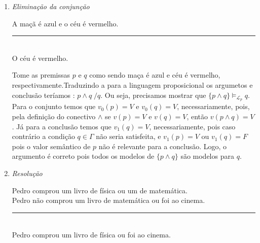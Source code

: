 \begin{enumerate}[label=\arabic*., left=0.5cm, align=left, nosep]
\begin{enumerate}[label=(\alph*), left=0.5cm, align=left, nosep]
                    \item \textit{Eliminação da conjunção}  
                        
                        A maçã é azul e o céu é vermelho. \\  
                        \rule{7cm}{0.4pt}\\
                        O céu é vermelho.
                        
                        Tome as premissas $p$ e $q$ como sendo maça é azul e céu é vermelho, respectivamente.Traduzindo a para a 
                        linguagem proposicional os argumetos e conclusão teríamos : $p \land q \; / q$. Ou seja, precisamos mostrar 
                        que $\{ p \land q \} \models_{\mathcal{L}_p} q$. Para o conjunto temos que $v_0(p) = V$ e $v_0(q) = V$, 
                        necessariamente, pois, pela definição do conectivo $\land$ se $v(p) = V$ e $v(q) = V$, então $v(p \land q) = 
                        V$. Já para a conclusão temos que $v_1(q) = V$, necessariamente, pois caso contrário a condição $q \in 
                        \Gamma$ não seria satisfeita, e $v_1(p) = V$ ou $v_1(q) = F$ pois o valor semântico de $p$ não é relevante 
                        para a conclusão. Logo, o argumento é correto pois todos os modelos de $\{p \land q\}$ são modelos para $q$.

                    \item \textit{Resolução}  
                        
                        Pedro comprou um livro de física ou um de matemática.\\  
                        Pedro não comprou um livro de matemática ou foi ao cinema.\\ 
                        \rule{7cm}{0.4pt}\\
                        Pedro comprou um livro de física ou foi ao cinema.
                        

\end{enumerate}
\end{enumerate}
